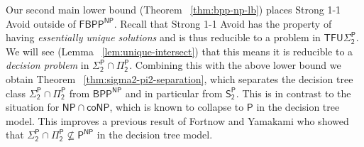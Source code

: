 Our second main lower bound (Theorem ~\ref{thm:bpp-np-lb}) places Strong 1-1 Avoid outside of $\mathsf{FBPP^{NP}}$. 
Recall that Strong 1-1 Avoid has the property of having \emph{essentially unique solutions} and is thus reducible to a problem in $\mathsf{TFU\Sigma_2^P}$. We will see (Lemma ~\ref{lem:unique-intersect}) that this means it is reducible to a \emph{decision problem} in $\mathsf{\Sigma_2^P \cap \Pi_2^P}$. Combining this with the above lower bound we obtain Theorem ~\ref{thm:sigma2-pi2-separation}, which separates the decision tree class 
$\mathsf{\Sigma_2^P \cap \Pi_2^P}$ from $\mathsf{BPP^{NP}}$ and in particular from $\mathsf{S_2^P}$.
This is in contrast to the situation for $\mathsf{NP} \cap \mathsf{coNP}$, which is known to collapse to $\mathsf{P}$ in the decision tree model. This improves a previous result of Fortnow and Yamakami \cite{forntnow-yamakami} who showed that $\mathsf{\Sigma_2^P \cap \Pi_2^P} \not\subseteq \mathsf{P^{NP}}$ in the decision tree model.

